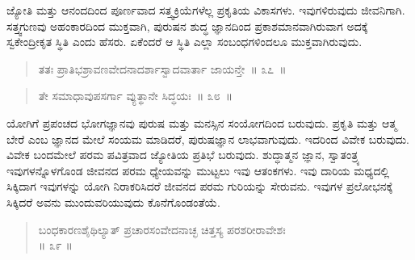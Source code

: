 \vspace{-0.4cm}


\vfill\eject

ಜ್ಯೋತಿ ಮತ್ತು ಆನಂದದಿಂದ ಪೂರ್ಣವಾದ ಸತ್ತ್ವಕ್ರಿಯೆಗಳೆಲ್ಲ ಪ್ರಕೃತಿಯ ವಿಕಾಸಗಳು. ಇವುಗಳಿರುವುದು ಜೀವನಿಗಾಗಿ. ಸತ್ತ್ವಗುಣವು ಅಹಂಕಾರದಿಂದ ಮುಕ್ತವಾಗಿ, ಪುರುಷನ ಶುದ್ಧ ಜ್ಞಾನದಿಂದ ಪ್ರಕಾಶಮಾನವಾಗಿರುವಾಗ ಅದಕ್ಕೆ ಸ್ವಕೇಂದ್ರೀಕೃತ ಸ್ಥಿತಿ ಎಂದು ಹೆಸರು. ಏಕೆಂದರೆ ಆ ಸ್ಥಿತಿ ಎಲ್ಲಾ ಸಂಬಂಧಗಳಿಂದಲೂ ಮುಕ್ತವಾಗಿರುವುದು. 


\begin{verse}
ತತಃ ಪ್ರಾತಿಭಶ್ರಾವಣವೇದನಾದರ್ಶಾಸ್ವಾದವಾರ್ತಾ ಜಾಯನ್ತೇ~॥ ೩೭~॥
\end{verse}

\vspace{-0.3cm}




\begin{verse}
ತೇ ಸಮಾಧಾವುಪಸರ್ಗಾ ವ್ಯುತ್ಥಾನೇ ಸಿದ್ಧಯಃ~॥ ೩೮~॥
\end{verse}

\vspace{-0.3cm}


\vspace{0.2cm}

ಯೋಗಿಗೆ ಪ್ರಪಂಚದ ಭೋಗಜ್ಞಾನವು ಪುರುಷ ಮತ್ತು ಮನಸ್ಸಿನ ಸಂಯೋಗದಿಂದ ಬರುವುದು. ಪ್ರಕೃತಿ ಮತ್ತು ಆತ್ಮ ಬೇರೆ ಎಂಬ ಜ್ಞಾನದ ಮೇಲೆ ಸಂಯಮ ಮಾಡಿದರೆ, ಪುರುಷಜ್ಞಾನ ಲಾಭವಾಗುವುದು. ಇದರಿಂದ ವಿವೇಕ ಬರುವುದು. ವಿವೇಕ ಬಂದಮೇಲೆ ಪರಮ ಪವಿತ್ರವಾದ ಜ್ಯೋತಿಯ ಪ್ರತಿಭೆ ಬರುವುದು. ಶುದ್ಧಾತ್ಮನ ಜ್ಞಾನ, ಸ್ವಾತಂತ್ರ್ಯ ಇವುಗಳನ್ನೊಳಗೊಂಡ ಜೀವನದ ಪರಮ ಧ್ಯೇಯವನ್ನು ಮುಟ್ಟಲು ಇವು ಆತಂಕಗಳು. ಇವು ದಾರಿಯ ಮಧ್ಯದಲ್ಲಿ ಸಿಕ್ಕಿದಾಗ ಇವುಗಳನ್ನು ಯೋಗಿ ನಿರಾಕರಿಸಿದರೆ ಜೀವನದ ಪರಮ ಗುರಿಯನ್ನು ಸೇರುವನು. ಇವುಗಳ ಪ್ರಲೋಭನಕ್ಕೆ ಸಿಕ್ಕಿದರೆ ಅವನು ಮುಂದುವರಿಯುವುದು ಕೊನೆಗೊಂಡಂತೆಯೆ. 


\begin{verse}
ಬಂಧಕಾರಣಶೈಥಿಲ್ಯಾತ್​ ಪ್ರಚಾರಸಂವೇದನಾಚ್ಛ ಚಿತ್ತಸ್ಯ ಪರಶರೀರಾವೇಶಃ\\\hfill ॥ ೩೯ ॥
\end{verse}

\vspace{-0.3cm}

